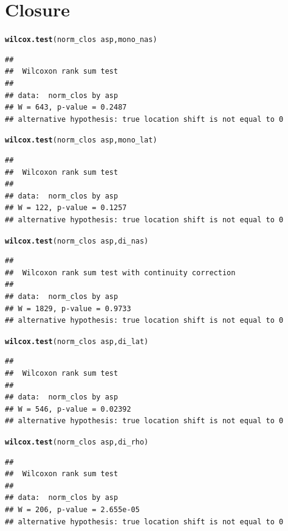 \documentclass[a4paper,11pt]{article}\usepackage[]{graphicx}\usepackage[]{color}
\makeatletter
\newcommand{\hlopt}[1]{\textcolor[rgb]{0,0,0}{#1}}%
\newcommand{\hlstd}[1]{\textcolor[rgb]{0.345,0.345,0.345}{#1}}%
\newcommand{\hlkwd}[1]{\textcolor[rgb]{0.737,0.353,0.396}{\textbf{#1}}}%
\newenvironment{kframe}{%
 \def\at@end@of@kframe{}%
 \ifinner\ifhmode%
  \def\at@end@of@kframe{\end{minipage}}%
  \begin{minipage}{\columnwidth}%
 \fi\fi%
 \def\FrameCommand##1{\hskip\@totalleftmargin \hskip-\fboxsep
 \colorbox{shadecolor}{##1}\hskip-\fboxsep
     \hskip-\linewidth \hskip-\@totalleftmargin \hskip\columnwidth}%
 \MakeFramed {\advance\hsize-\width
   \@totalleftmargin\z@ \linewidth\hsize
   \@setminipage}}%
 {\par\unskip\endMakeFramed%
 \at@end@of@kframe}
\newenvironment{knitrout}{}{} %
\makeatother
\begin{document}
\section{Closure}
\begin{knitrout}
\color{fgcolor}\begin{kframe}
\begin{alltt}
\hlkwd{wilcox.test}\hlstd{(norm_clos} \hlopt{~} \hlstd{asp, mono_nas)}
\end{alltt}
\begin{verbatim}
## 
## 	Wilcoxon rank sum test
## 
## data:  norm_clos by asp
## W = 643, p-value = 0.2487
## alternative hypothesis: true location shift is not equal to 0
\end{verbatim}
\begin{alltt}
\hlkwd{wilcox.test}\hlstd{(norm_clos} \hlopt{~} \hlstd{asp, mono_lat)}
\end{alltt}
\begin{verbatim}
## 
## 	Wilcoxon rank sum test
## 
## data:  norm_clos by asp
## W = 122, p-value = 0.1257
## alternative hypothesis: true location shift is not equal to 0
\end{verbatim}
\begin{alltt}
\hlkwd{wilcox.test}\hlstd{(norm_clos} \hlopt{~} \hlstd{asp, di_nas)}
\end{alltt}
\begin{verbatim}
## 
## 	Wilcoxon rank sum test with continuity correction
## 
## data:  norm_clos by asp
## W = 1829, p-value = 0.9733
## alternative hypothesis: true location shift is not equal to 0
\end{verbatim}
\begin{alltt}
\hlkwd{wilcox.test}\hlstd{(norm_clos} \hlopt{~} \hlstd{asp, di_lat)}
\end{alltt}
\begin{verbatim}
## 
## 	Wilcoxon rank sum test
## 
## data:  norm_clos by asp
## W = 546, p-value = 0.02392
## alternative hypothesis: true location shift is not equal to 0
\end{verbatim}
\begin{alltt}
\hlkwd{wilcox.test}\hlstd{(norm_clos} \hlopt{~} \hlstd{asp, di_rho)}
\end{alltt}
\begin{verbatim}
## 
## 	Wilcoxon rank sum test
## 
## data:  norm_clos by asp
## W = 206, p-value = 2.655e-05
## alternative hypothesis: true location shift is not equal to 0
\end{verbatim}
\end{kframe}
\end{knitrout}
\end{document}
